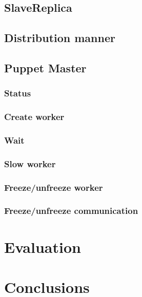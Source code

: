 \documentclass[times, 10pt,twocolumn]{article}
\begin{document}
    	\subsection{SlaveReplica}
    	
    	\subsection{Distribution manner}
    	
    	\subsection{Puppet Master}
    
    	\subsubsection{Status}
    		
    	\subsubsection{Create worker}
    	
    	\subsubsection{Wait}
    	
    	\subsubsection{Slow worker}
    	
    	\subsubsection{Freeze/unfreeze worker}
    	
    	\subsubsection{Freeze/unfreeze communication}
	
	\section{Evaluation}
	
	\section{Conclusions}
	
	
	
\end{document}
